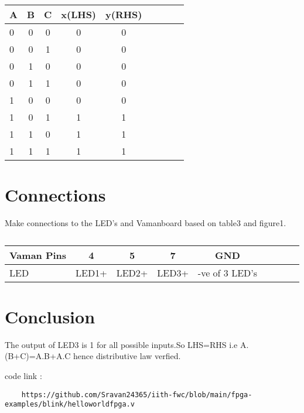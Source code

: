 \documentclass[10pt, a4paper]{article}
\begin{document}
\begin{table}[htbp]
 \begin{center}
    \begin{tabular}{|l|c|c|c|c|c|c|c|c} \hline \textbf{A}
  & \textbf{B} & \textbf{C} & \textbf{x(LHS)}& \textbf{y(RHS)} \\
 \hline
0&0&0&0&0 \\ \hline
0&0&1&0&0 \\ \hline
0&1&0&0&0\\ \hline
0&1&1&0&0  \\ \hline
1&0&0&0&0 \\ \hline
1&0&1&1&1\\ \hline
1&1&0&1&1\\ \hline
1&1&1&1&1\\ \hline
\end{tabular}   
\end{center}
\caption{\label{table:dummytable} }
\end{table}







\section{Connections}

Make connections to the LED's and Vamanboard based on table3 and figure1.
\begin{table}[htbp]
 \begin{center}
    \begin{tabular}{|l|c|c|c|c|c|c|c|c} \hline \textbf{Vaman Pins}
  & \textbf{4} & \textbf{5} & \textbf{7}& \textbf{GND}\\
 \hline
LED&LED1+&LED2+&LED3+&-ve of 3 LED's\\ \hline

\end{tabular}   
\end{center}
\caption{\label{table:dummytable} }
\end{table}




\section{Conclusion}
The output of LED3  is 1 for all possible inputs.So LHS=RHS i.e  A.(B+C)=A.B+A.C hence distributive law verfied.

code link :
 \begin{lstlisting}
    https://github.com/Sravan24365/iith-fwc/blob/main/fpga-examples/blink/helloworldfpga.v
\end{lstlisting}
\end{document}
